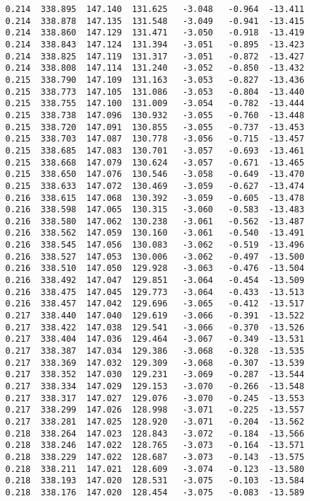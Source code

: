 \begin{verbatim}
   0.214  338.895  147.140  131.625   -3.048   -0.964  -13.411
   0.214  338.878  147.135  131.548   -3.049   -0.941  -13.415
   0.214  338.860  147.129  131.471   -3.050   -0.918  -13.419
   0.214  338.843  147.124  131.394   -3.051   -0.895  -13.423
   0.214  338.825  147.119  131.317   -3.051   -0.872  -13.427
   0.214  338.808  147.114  131.240   -3.052   -0.850  -13.432
   0.215  338.790  147.109  131.163   -3.053   -0.827  -13.436
   0.215  338.773  147.105  131.086   -3.053   -0.804  -13.440
   0.215  338.755  147.100  131.009   -3.054   -0.782  -13.444
   0.215  338.738  147.096  130.932   -3.055   -0.760  -13.448
   0.215  338.720  147.091  130.855   -3.055   -0.737  -13.453
   0.215  338.703  147.087  130.778   -3.056   -0.715  -13.457
   0.215  338.685  147.083  130.701   -3.057   -0.693  -13.461
   0.215  338.668  147.079  130.624   -3.057   -0.671  -13.465
   0.215  338.650  147.076  130.546   -3.058   -0.649  -13.470
   0.215  338.633  147.072  130.469   -3.059   -0.627  -13.474
   0.216  338.615  147.068  130.392   -3.059   -0.605  -13.478
   0.216  338.598  147.065  130.315   -3.060   -0.583  -13.483
   0.216  338.580  147.062  130.238   -3.061   -0.562  -13.487
   0.216  338.562  147.059  130.160   -3.061   -0.540  -13.491
   0.216  338.545  147.056  130.083   -3.062   -0.519  -13.496
   0.216  338.527  147.053  130.006   -3.062   -0.497  -13.500
   0.216  338.510  147.050  129.928   -3.063   -0.476  -13.504
   0.216  338.492  147.047  129.851   -3.064   -0.454  -13.509
   0.216  338.475  147.045  129.773   -3.064   -0.433  -13.513
   0.216  338.457  147.042  129.696   -3.065   -0.412  -13.517
   0.217  338.440  147.040  129.619   -3.066   -0.391  -13.522
   0.217  338.422  147.038  129.541   -3.066   -0.370  -13.526
   0.217  338.404  147.036  129.464   -3.067   -0.349  -13.531
   0.217  338.387  147.034  129.386   -3.068   -0.328  -13.535
   0.217  338.369  147.032  129.309   -3.068   -0.307  -13.539
   0.217  338.352  147.030  129.231   -3.069   -0.287  -13.544
   0.217  338.334  147.029  129.153   -3.070   -0.266  -13.548
   0.217  338.317  147.027  129.076   -3.070   -0.245  -13.553
   0.217  338.299  147.026  128.998   -3.071   -0.225  -13.557
   0.217  338.281  147.025  128.920   -3.071   -0.204  -13.562
   0.218  338.264  147.023  128.843   -3.072   -0.184  -13.566
   0.218  338.246  147.022  128.765   -3.073   -0.164  -13.571
   0.218  338.229  147.022  128.687   -3.073   -0.143  -13.575
   0.218  338.211  147.021  128.609   -3.074   -0.123  -13.580
   0.218  338.193  147.020  128.531   -3.075   -0.103  -13.584
   0.218  338.176  147.020  128.454   -3.075   -0.083  -13.589

\end{verbatim}
